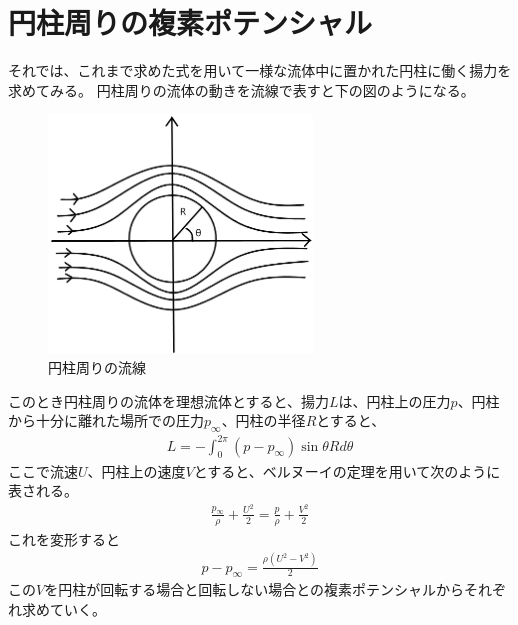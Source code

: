 \documentclass[10pt,b5paper,papersize,dvipdfmx]{jsbook}
\begin{document}
\section{円柱周りの複素ポテンシャル}
それでは、これまで求めた式を用いて一様な流体中に置かれた円柱に働く揚力を求めてみる。  円柱周りの流体の動きを流線で表すと下の図のようになる。
\begin{figure}[ht]
  \centering
  \includegraphics[width=70mm]{img/ryuutai1.png}
  \caption{円柱周りの流線}
\end{figure}
\par
このとき円柱周りの流体を理想流体とすると、揚力$L$は、円柱上の圧力$p$、円柱から十分に離れた場所での圧力$p_\infty$、円柱の半径$R$とすると、
\begin{align}
  L = -\int_0^{2\pi}(p-p_\infty)\sin\theta Rd\theta
\end{align}
ここで流速$U$、円柱上の速度$V$とすると、ベルヌーイの定理を用いて次のように表される。
\begin{align}
  \frac{p_\infty}{\rho} + \frac{U^2}{2} = \frac{p}{\rho} + \frac{V^2}{2}
\end{align}
これを変形すると
\begin{align}
  p-p_\infty = \frac{\rho(U^2-V^2)}{2}
\end{align}
この$V$を円柱が回転する場合と回転しない場合との複素ポテンシャルからそれぞれ求めていく。
\end{document}
